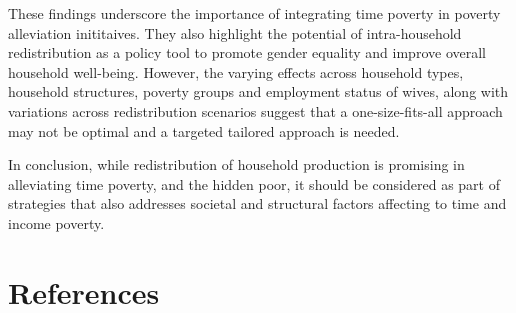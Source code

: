 \documentclass[
  11pt,
]{article}
\begin{document}
These findings underscore the importance of integrating time poverty in
poverty alleviation inititaives. They also highlight the potential of
intra-household redistribution as a policy tool to promote gender
equality and improve overall household well-being. However, the varying
effects across household types, household structures, poverty groups and
employment status of wives, along with variations across redistribution
scenarios suggest that a one-size-fits-all approach may not be optimal
and a targeted tailored approach is needed.

In conclusion, while redistribution of household production is promising
in alleviating time poverty, and the hidden poor, it should be
considered as part of strategies that also addresses societal and
structural factors affecting to time and income poverty.

\section*{References}\label{references}
\end{document}
